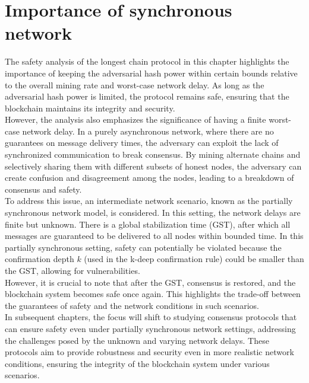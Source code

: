 \documentclass{report}
\begin{document}
\section{Importance of synchronous network}
The safety analysis of the longest chain protocol in this chapter highlights the importance of keeping the adversarial hash power within certain bounds relative to the overall mining rate and worst-case network delay. As long as the adversarial hash power is limited, the protocol remains safe, ensuring that the blockchain maintains its integrity and security.\\
However, the analysis also emphasizes the significance of having a finite worst-case network delay. In a purely asynchronous network, where there are no guarantees on message delivery times, the adversary can exploit the lack of synchronized communication to break consensus. By mining alternate chains and selectively sharing them with different subsets of honest nodes, the adversary can create confusion and disagreement among the nodes, leading to a breakdown of consensus and safety.\\
To address this issue, an intermediate network scenario, known as the partially synchronous network model, is considered. In this setting, the network delays are finite but unknown. There is a global stabilization time (GST), after which all messages are guaranteed to be delivered to all nodes within bounded time. In this partially synchronous setting, safety can potentially be violated because the confirmation depth $k$ (used in the k-deep confirmation rule) could be smaller than the GST, allowing for vulnerabilities.\\
However, it is crucial to note that after the GST, consensus is restored, and the blockchain system becomes safe once again. This highlights the trade-off between the guarantees of safety and the network conditions in such scenarios.\\
In subsequent chapters, the focus will shift to studying consensus protocols that can ensure safety even under partially synchronous network settings, addressing the challenges posed by the unknown and varying network delays. These protocols aim to provide robustness and security even in more realistic network conditions, ensuring the integrity of the blockchain system under various scenarios.
\end{document}
